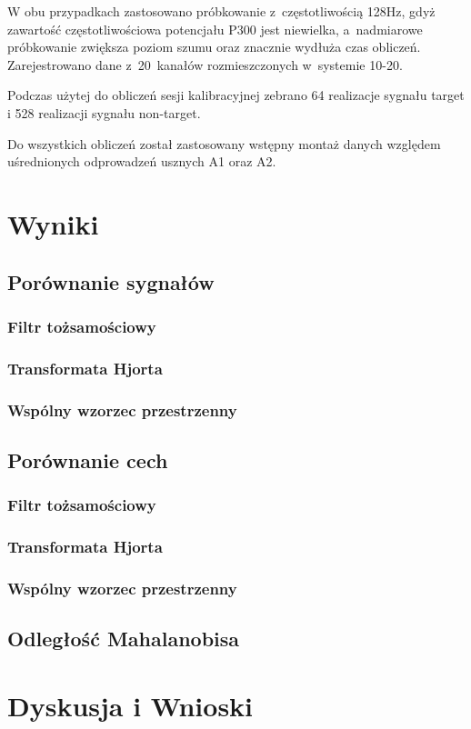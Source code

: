 \documentclass[licencjacka,openright]{pracamgr}
\begin{document}
W obu przypadkach zastosowano próbkowanie z~częstotliwością 128Hz, gdyż zawartość częstotliwościowa potencjału P300 jest niewielka, a~nadmiarowe próbkowanie zwiększa poziom szumu oraz znacznie wydłuża czas obliczeń. Zarejestrowano dane z~20~kanałów rozmieszczonych w~systemie 10-20.

Podczas użytej do obliczeń sesji kalibracyjnej zebrano 64 realizacje sygnału target i 528 realizacji sygnału non-target.

Do wszystkich obliczeń został zastosowany wstępny montaż danych względem uśrednionych odprowadzeń usznych A1 oraz A2. 

\chapter{Wyniki}

\section{Porównanie sygnałów}

\subsection{Filtr tożsamościowy}
\subsection{Transformata Hjorta}
\subsection{Wspólny wzorzec przestrzenny}

\section{Porównanie cech}

\subsection{Filtr tożsamościowy}
\subsection{Transformata Hjorta}
\subsection{Wspólny wzorzec przestrzenny}

\section{Odległość Mahalanobisa}

\chapter{Dyskusja i Wnioski}



\end{document}
